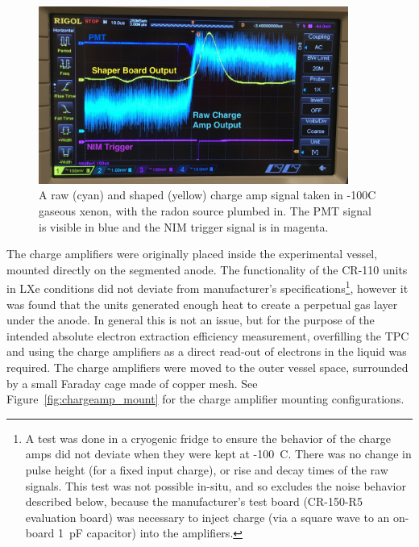 \begin{figure}[htbp]
\begin{center}
\includegraphics[width=4in]{figures/testbed/charge_amp_shaper.jpg}
\caption{A raw (cyan) and shaped (yellow) charge amp signal taken in -100C gaseous xenon, with the radon source plumbed in. The \acs{PMT} signal is visible in blue and the \acs{NIM} trigger signal is in magenta.}
\label{fig:shaper}
\end{center}
\end{figure}

The charge amplifiers were originally placed inside the experimental vessel, mounted directly on the segmented anode. The functionality of the CR-110 units in \ac{LXe} conditions did not deviate from manufacturer's specifications\footnote{A test was done in a cryogenic fridge to ensure the behavior of the charge amps did not deviate when they were kept at -100~C. There was no change in pulse height (for a fixed input charge), or rise and decay times of the raw signals. This test was not possible in-situ, and so excludes the noise behavior described below, because the manufacturer's test board (CR-150-R5 evaluation board) was necessary to inject charge (via a square wave to an on-board 1~pF capacitor) into the amplifiers.}, however it was found that the units generated enough heat to create a perpetual gas layer under the anode. In general this is not an issue, but for the purpose of the intended absolute electron extraction efficiency measurement, overfilling the \ac{TPC} and using the charge amplifiers as a direct read-out of electrons in the liquid was required. The charge amplifiers were moved to the outer vessel space, surrounded by a small Faraday cage made of copper mesh. See Figure~\ref{fig:chargeamp_mount} for the charge amplifier mounting configurations.

